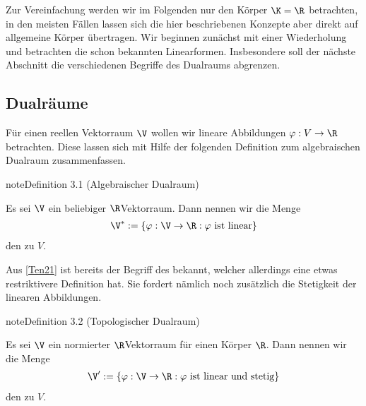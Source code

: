 \documentclass[letterpaper,10pt,german]{jupyterBook}
\begin{document}
\sphinxAtStartPar
Zur Vereinfachung werden wir im Folgenden nur den Körper \(\K=\R\) betrachten, in den meisten Fällen lassen sich die hier beschriebenen Konzepte aber direkt auf allgemeine Körper übertragen.
Wir beginnen zunächst mit einer Wiederholung und betrachten die schon bekannten Linearformen.
Insbesondere soll der nächste Abschnitt die verschiedenen Begriffe des Dualraums abgrenzen.


\subsection{Dualräume}
\label{\detokenize{vektoranalysis/multilinear:dualraume}}
\sphinxAtStartPar
Für einen reellen Vektorraum \(\V\) wollen wir lineare Abbildungen \(\varphi:V\to\R\) betrachten.
Diese lassen sich mit Hilfe der folgenden Definition zum algebraischen Dualraum zusammenfassen.
\label{vektoranalysis/multilinear:def:algebraischerDualraum}
\begin{sphinxadmonition}{note}{Definition 3.1 (Algebraischer Dualraum)}



\sphinxAtStartPar
Es sei \(\V\) ein beliebiger \(\R\)\sphinxhyphen{}Vektorraum.
Dann nennen wir die Menge
\begin{equation*}
\begin{split}\V^\ast := \{\varphi:\V\rightarrow\R: \varphi\text{ ist linear}\}\end{split}
\end{equation*}
\sphinxAtStartPar
den  zu \(V\).
\end{sphinxadmonition}

\sphinxAtStartPar
Aus {[}\hyperlink{cite.references:id15}{Ten21}{]} ist bereits der Begriff des  bekannt, welcher allerdings eine etwas restriktivere Definition hat.
Sie fordert nämlich noch zusätzlich die Stetigkeit der linearen Abbildungen.
\label{vektoranalysis/multilinear:def:topologischerDualraum}
\begin{sphinxadmonition}{note}{Definition 3.2 (Topologischer Dualraum)}



\sphinxAtStartPar
Es sei \(\V\) ein normierter \(\R\)\sphinxhyphen{}Vektorraum für einen Körper \(\R\).
Dann nennen wir die Menge
\begin{equation*}
\begin{split}\V^\prime := \{\varphi:\V\rightarrow\R: \varphi\text{ ist linear und stetig}\}\end{split}
\end{equation*}
\sphinxAtStartPar
den  zu \(V\).
\end{sphinxadmonition}
\end{document}
